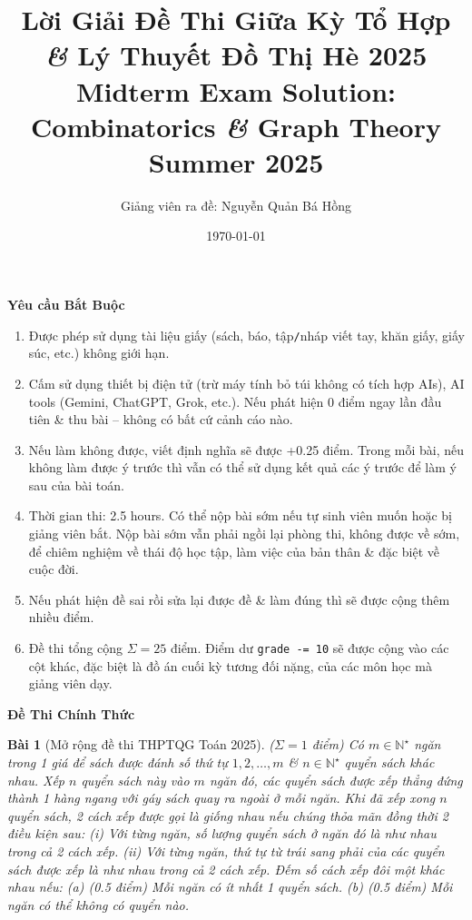 \documentclass{article}
\title{Lời Giải Đề Thi Giữa Kỳ Tổ Hợp {\it\&} Lý Thuyết Đồ Thị Hè 2025\\Midterm Exam Solution: Combinatorics {\it\&} Graph Theory Summer 2025}
\author{Giảng viên ra đề: Nguyễn Quản Bá Hồng}
\date{\today}
\newtheorem{baitoan}{Bài}
\begin{document}
\maketitle
\begin{center}\large
    \textbf{\textsf{Yêu cầu Bắt Buộc}}
\end{center}

\begin{enumerate}
    \item Được phép sử dụng tài liệu giấy (sách, báo, tập{\tt/}nháp viết tay, khăn giấy, giấy súc, etc.) không giới hạn.
    \item Cấm sử dụng thiết bị điện tử (trừ máy tính bỏ túi không có tích hợp AIs), AI tools (Gemini, ChatGPT, Grok, etc.). Nếu phát hiện 0 điểm ngay lần đầu tiên \& thu bài -- không có bất cứ cảnh cáo nào.
    \item Nếu làm không được, viết định nghĩa sẽ được +0.25 điểm. Trong mỗi bài, nếu không làm được ý trước thì vẫn có thể sử dụng kết quả các ý trước để làm ý sau của bài toán.
    \item Thời gian thi: 2.5 hours. Có thể nộp bài sớm nếu tự sinh viên muốn hoặc bị giảng viên bắt. Nộp bài sớm vẫn phải ngồi lại phòng thi, không được về sớm, để chiêm nghiệm về thái độ học tập, làm việc của bản thân \& đặc biệt về cuộc đời.
    \item Nếu phát hiện đề sai rồi sửa lại được đề \& làm đúng thì sẽ được cộng thêm nhiều điểm.
    \item Đề thi tổng cộng $\Sigma = 25$ điểm. Điểm dư {\tt grade -= 10} sẽ được cộng vào các cột khác, đặc biệt là đồ án cuối kỳ tương đối nặng, của các môn học mà giảng viên dạy.
\end{enumerate}

\begin{center}\large
    \textbf{\textsf{Đề Thi Chính Thức}}
\end{center}

\begin{baitoan}[Mở rộng đề thi THPTQG Toán 2025]
    {\rm($\Sigma = 1$ điểm)} Có $m\in\mathbb{N}^\star$ ngăn trong 1 giá để sách được đánh số thứ tự $1,2,\ldots,m$ \& $n\in\mathbb{N}^\star$ quyển sách khác nhau. Xếp $n$ quyển sách này vào $m$ ngăn đó, các quyển sách được xếp thẳng đứng thành 1 hàng ngang với gáy sách quay ra ngoài ở mỗi ngăn. Khi đã xếp xong $n$ quyển sách, 2 cách xếp được gọi là {\rm giống nhau} nếu chúng thỏa mãn đồng thời 2 điều kiện sau: (i) Với từng ngăn, số lượng quyển sách ở ngăn đó là như nhau trong cả 2 cách xếp. (ii) Với từng ngăn, thứ tự từ trái sang phải của các quyển sách được xếp là như nhau trong cả 2 cách xếp. Đếm số cách xếp đôi một khác nhau nếu: (a) {\rm(0.5 điểm)} Mỗi ngăn có ít nhất 1 quyển sách. (b) {\rm(0.5 điểm)} Mỗi ngăn có thể không có quyển nào.
\end{baitoan}
\end{document}
